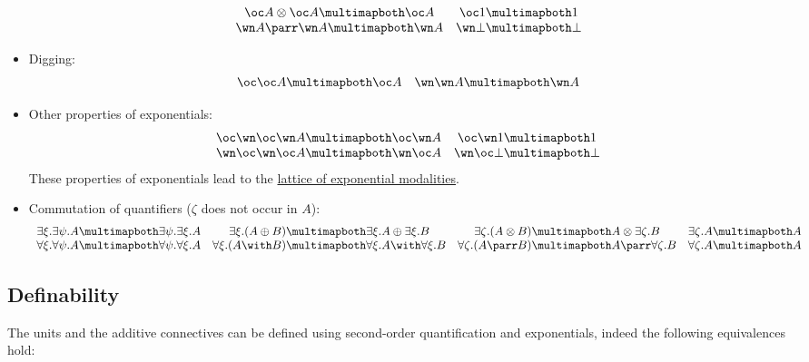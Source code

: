 \begin{itemize}
\begin{equation*}
\begin{array}{cc}
       \oc A \tens \oc A \linequiv \oc A & \oc \one \linequiv \one \\
       \wn A \parr \wn A \linequiv \wn A & \wn \bot \linequiv \bot
    \end{array}
  \end{equation*}
\item
  Digging:
  \begin{equation*}
    \begin{array}{cc}
       \oc\oc A \linequiv \oc A & \wn\wn A \linequiv \wn A
    \end{array}
  \end{equation*}
\item
  Other properties of exponentials:
  \begin{equation*}
    \begin{array}{cc}
       \oc\wn\oc\wn A \linequiv \oc\wn A & \oc\wn \one \linequiv \one \\
       \wn\oc\wn\oc A \linequiv \wn\oc A & \wn\oc \bot \linequiv \bot
    \end{array}
  \end{equation*}
These properties of exponentials lead to
the \hyperref[lattice-of-exponential-modalities]{lattice of exponential modalities}.
\item
  Commutation of quantifiers (\(\zeta\) does not occur in \(A\)):
  \begin{equation*}
    \begin{array}{cccc}
       \exists \xi. \exists \psi. A \linequiv \exists \psi. \exists \xi. A & \exists \xi.(A \plus B) \linequiv \exists \xi.A \plus \exists \xi.B & \exists \zeta.(A\tens B) \linequiv A\tens\exists \zeta.B & \exists \zeta.A \linequiv A \\
       \forall \xi. \forall \psi. A \linequiv \forall \psi. \forall \xi. A & \forall \xi.(A \with B) \linequiv \forall \xi.A \with \forall \xi.B & \forall \zeta.(A\parr B) \linequiv A\parr\forall \zeta.B & \forall \zeta.A \linequiv A
    \end{array}
  \end{equation*}
\end{itemize}


\subsection{Definability}\label{definability}

The units and the additive connectives can be defined using second-order
quantification and exponentials, indeed the following equivalences hold:

